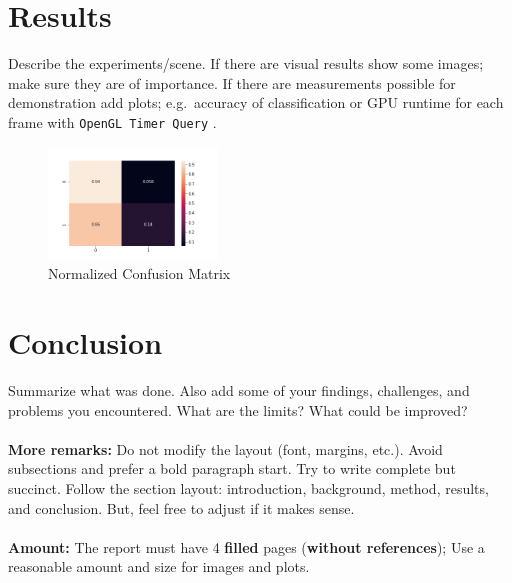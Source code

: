 \documentclass[11pt, a4paper, twocolumn]{article}
\begin{document}
\section*{Results}
Describe the experiments/scene.
If there are visual results show some images; make sure they are of importance.
If there are measurements possible for demonstration add plots; e.g.~accuracy of classification or GPU runtime for each frame with \texttt{OpenGL Timer Query} \cite{lighthouse_timer}.
%
\begin{figure}[h]
    \centering
    \includegraphics[width=0.4\textwidth]{images/confusion_matrix.png}
    \caption{Normalized Confusion Matrix}
    \label{fig:conf_matrix}
\end{figure}

\section*{Conclusion}
Summarize what was done.
Also add some of your findings, challenges, and problems you encountered. 
What are the limits?
What could be improved?\\
~\\
\textbf{More remarks:}
Do not modify the layout (font, margins, etc.).
Avoid subsections and prefer a bold paragraph start.
Try to write complete but \mbox{succinct}.
Follow the section layout: introduction, background, method, results, and conclusion.
But, feel free to adjust if it makes sense. \\
~\\
\textbf{Amount:} The report must have 4 \textbf{filled} pages (\textbf{without references}); Use a reasonable amount and size for images and plots.


{}

%
\end{document}
